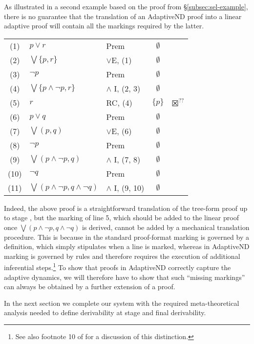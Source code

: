 \documentclass[]{article}
\begin{document}
As illustrated in a second example based on the proof from \S \ref{subsec:sel-example}, there is no guarantee that the translation of an {\sf AdaptiveND} proof into a linear adaptive proof will contain all the markings required by the latter.
\begin{center}
    \begin{tabular}{cllcl}
        (1) & $p \vee r$ & Prem & $\emptyset$\\
        (2) & $\bigvee \{p, r\}$ & $\vee$E, (1) & $\emptyset$\\
        (3) & $\neg p$ & Prem & $\emptyset$\\
        (4) & $\bigvee \{p \wedge \neg p, r\}$ & $\wedge$ I, (2, 3) & $\emptyset$\\
        (5) & $r$ & RC, (4) & $\{p\}$ & $\XBox^{??}$\\
        (6) & $p \vee q$ & Prem & $\emptyset$\\
        (7) & $\bigvee(p, q)$ & $\vee$E, (6)& $\emptyset$\\
        (8) & $\neg p$ & Prem & $\emptyset$\\
        (9) & $\bigvee(p \wedge \neg p, q)$ & $\wedge$ I, (7, 8) & $\emptyset$\\
        (10) & $\neg q$ & Prem & $\emptyset$\\
        (11) & $\bigvee(p \wedge \neg p, q \wedge \neg q)$ & $\wedge$ I, (9, 10) & $\emptyset$
    \end{tabular}
\end{center}
Indeed, the above proof is a straightforward translation of the tree-form proof up to stage {}, but the marking of line 5, which should be added to the linear proof once $\bigvee(p \wedge \neg p, q \wedge \neg q)$ is derived, cannot be added by a mechanical translation procedure. This is because in the standard proof-format marking is governed by a definition, which simply stipulates when a line is marked, whereas in \textsf{AdaptiveND} marking is governed by rules and therefore requires the execution of additional inferential steps.\footnote{See also footnote 10 of \cite{BDVM08} for a discussion of this distinction.} To show that proofs in \textsf{AdaptiveND} correctly capture the adaptive dynamics, we will therefore have to show that such ``missing markings'' can always be obtained by a further extension of a proof.

In the next section we complete our system with the required meta-theoretical analysis needed to define derivability at stage and final derivability.
\end{document}

